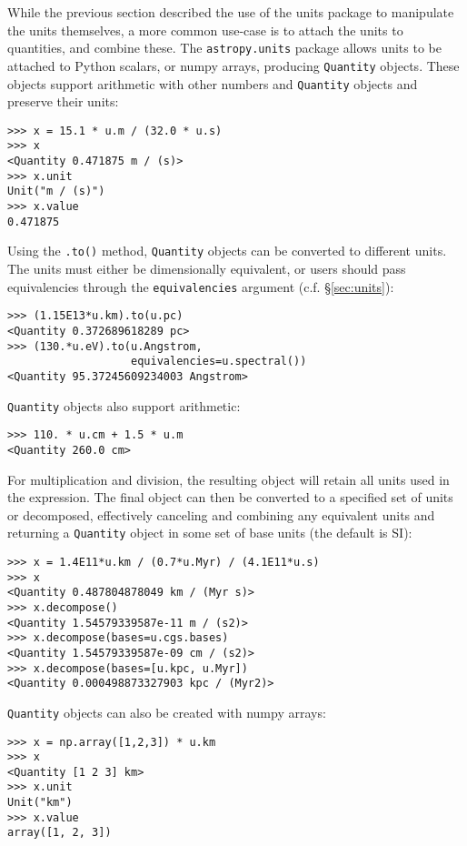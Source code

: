 \documentclass[traditabstract]{aa}
\begin{document}
\label{sec:quantities}

While the previous section described the use of the units package to
manipulate the units themselves, a more common use-case is to attach the units
to quantities, and combine these. The \texttt{astropy.units} package allows
units to be attached to Python scalars, or \gls{numpy} arrays, producing
\texttt{Quantity} objects. These objects support arithmetic with other numbers
and \texttt{Quantity} objects and preserve their units:
\begin{verbatim}
>>> x = 15.1 * u.m / (32.0 * u.s)
>>> x
<Quantity 0.471875 m / (s)>
>>> x.unit
Unit("m / (s)")
>>> x.value
0.471875
\end{verbatim}

Using the \texttt{.to()} method, \texttt{Quantity} objects can be
converted to different units. The units must either be dimensionally
equivalent, or users should pass equivalencies through the
\texttt{equivalencies} argument (c.f. \S\ref{sec:units}):
\begin{verbatim}
>>> (1.15E13*u.km).to(u.pc)
<Quantity 0.372689618289 pc>
>>> (130.*u.eV).to(u.Angstrom,
                   equivalencies=u.spectral())
<Quantity 95.37245609234003 Angstrom>
\end{verbatim}

\texttt{Quantity} objects also support arithmetic:
\begin{verbatim}
>>> 110. * u.cm + 1.5 * u.m
<Quantity 260.0 cm>
\end{verbatim}

For multiplication and division, the resulting object will retain all
units used in the expression. The final object can then be converted
to a specified set of units or decomposed, effectively canceling
and combining any equivalent units and returning a \texttt{Quantity}
object in some set of base units (the default is SI):

\begin{verbatim}
>>> x = 1.4E11*u.km / (0.7*u.Myr) / (4.1E11*u.s)
>>> x
<Quantity 0.487804878049 km / (Myr s)>
>>> x.decompose()
<Quantity 1.54579339587e-11 m / (s2)>
>>> x.decompose(bases=u.cgs.bases)
<Quantity 1.54579339587e-09 cm / (s2)>
>>> x.decompose(bases=[u.kpc, u.Myr])
<Quantity 0.000498873327903 kpc / (Myr2)>
\end{verbatim}

\texttt{Quantity} objects can also be created with \gls{numpy}
arrays:
\begin{verbatim}
>>> x = np.array([1,2,3]) * u.km
>>> x
<Quantity [1 2 3] km>
>>> x.unit
Unit("km")
>>> x.value
array([1, 2, 3])
\end{verbatim}
\end{document}
